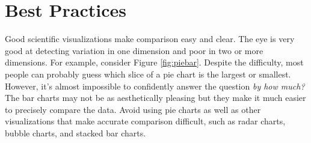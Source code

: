 \section*{Best Practices} %

Good scientific visualizations make comparison easy and clear.
The eye is very good at detecting variation in one dimension and poor in two or more dimensions.
For example, consider Figure \ref{fig:piebar}.
Despite the difficulty, most people can probably guess which slice of a pie chart is the largest or smallest.
However, it's almost impossible to confidently answer the question \emph{by how much?} The bar charts may not be as aesthetically pleasing but they make it much easier to precisely compare the data.
Avoid using pie charts as well as other visualizations that make accurate comparison difficult, such as radar charts, bubble charts, and stacked bar charts.


